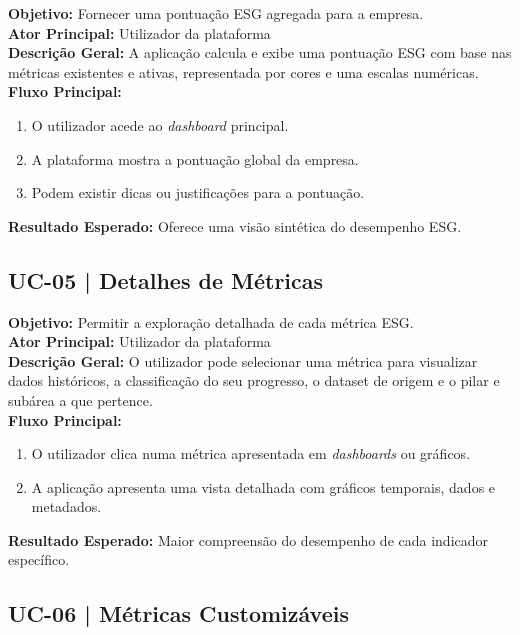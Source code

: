\textbf{Objetivo:} Fornecer uma pontuação ESG agregada para a empresa.\\
\textbf{Ator Principal:} Utilizador da plataforma\\
\textbf{Descrição Geral:} A aplicação calcula e exibe uma pontuação ESG com base nas métricas existentes e ativas, representada por cores e uma escalas numéricas.\\
\textbf{Fluxo Principal:}
\begin{enumerate}
    \item O utilizador acede ao \textit{dashboard} principal.
    \item A plataforma mostra a pontuação global da empresa.
    \item Podem existir dicas ou justificações para a pontuação.
\end{enumerate}
\textbf{Resultado Esperado:} Oferece uma visão sintética do desempenho ESG.

\subsection{UC-05 | Detalhes de Métricas}

\textbf{Objetivo:} Permitir a exploração detalhada de cada métrica ESG.\\
\textbf{Ator Principal:} Utilizador da plataforma\\
\textbf{Descrição Geral:} O utilizador pode selecionar uma métrica para visualizar dados históricos, a classificação do seu progresso, o dataset de origem e o pilar e subárea a que pertence.\\
\textbf{Fluxo Principal:}
\begin{enumerate}
    \item O utilizador clica numa métrica apresentada em \textit{dashboards} ou gráficos.
    \item A aplicação apresenta uma vista detalhada com gráficos temporais, dados e metadados.
\end{enumerate}
\textbf{Resultado Esperado:} Maior compreensão do desempenho de cada indicador específico.

\subsection{UC-06 | Métricas Customizáveis}

